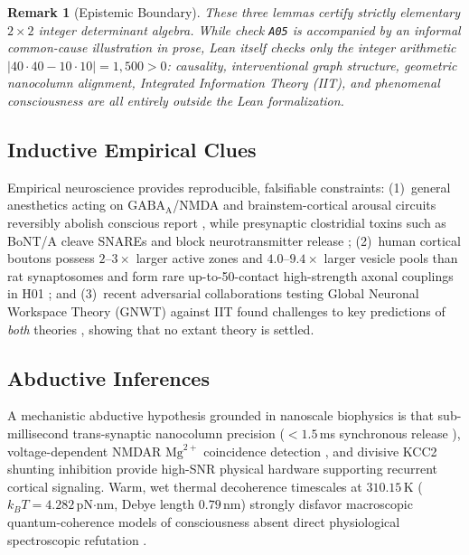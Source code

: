 \documentclass[11pt,letterpaper]{amsart}
\newtheorem{remark}[theorem]{Remark}
\begin{document}
\begin{remark}[Epistemic Boundary]
These three lemmas certify strictly elementary $2\times 2$ integer determinant algebra. While check \texttt{A05} is accompanied by an \emph{informal} common-cause illustration in prose, Lean itself checks only the integer arithmetic $|40\cdot 40 - 10\cdot 10| = 1{,}500 > 0$: causality, interventional graph structure, geometric nanocolumn alignment, Integrated Information Theory (IIT), and phenomenal consciousness are all entirely outside the Lean formalization.
\end{remark}

\subsection{Inductive Empirical Clues}
Empirical neuroscience provides reproducible, falsifiable constraints: (1)~general anesthetics acting on $\mathrm{GABA_A}$/NMDA and brainstem-cortical arousal circuits reversibly abolish conscious report \cite{brown2010anesthesia}, while presynaptic clostridial toxins such as BoNT/A cleave SNAREs and block neurotransmitter release \cite{dong2019neurotoxins}; (2)~human cortical boutons possess $2\text{--}3\times$ larger active zones and $4.0\text{--}9.4\times$ larger vesicle pools than rat synaptosomes \cite{rollenhagen2024l1,yakoubi2019layer4,rollenhagen2020human} and form rare up-to-50-contact high-strength axonal couplings in H01 \cite{shapsoncoe2024h01}; and (3)~recent adversarial collaborations testing Global Neuronal Workspace Theory (GNWT) against IIT found challenges to key predictions of \emph{both} theories \cite{cogitate2025adversarial}, showing that no extant theory is settled.

\subsection{Abductive Inferences}
A mechanistic abductive hypothesis grounded in nanoscale biophysics is that sub-millisecond trans-synaptic nanocolumn precision ($<1.5\,$ms synchronous release \cite{tang2016nanocolumn}), voltage-dependent NMDAR $\mathrm{Mg}^{2+}$ coincidence detection \cite{jahr1990nmda}, and divisive KCC2 shunting inhibition provide high-SNR physical hardware supporting recurrent cortical signaling. Warm, wet thermal decoherence timescales at $310.15\,$K ($k_B T = 4.282\,$pN$\cdot$nm, Debye length $0.79\,$nm) strongly disfavor macroscopic quantum-coherence models of consciousness absent direct physiological spectroscopic refutation \cite{tegmark2000decoherence}.
\end{document}

